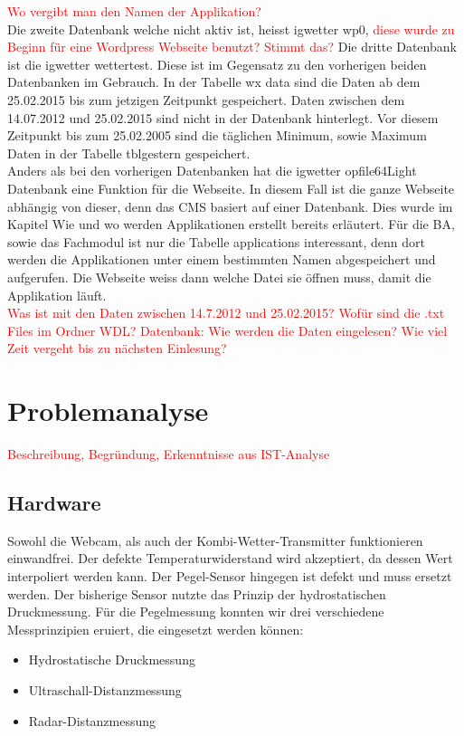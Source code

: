 \documentclass[a4paper,ngerman, 12pt]{report}
\newcommand\Diskussionspunkt[1]{\textcolor{red}{#1}}
\begin{document}
\Diskussionspunkt{Wo vergibt man den Namen der Applikation?}\\
Die zweite Datenbank welche nicht aktiv ist, heisst igwetter wp0, \Diskussionspunkt{diese wurde zu Beginn für eine Wordpress Webseite benutzt? Stimmt das?} Die dritte Datenbank ist die igwetter wettertest. Diese ist im Gegensatz zu den vorherigen beiden Datenbanken im Gebrauch. In der Tabelle wx data sind die Daten ab dem 25.02.2015 bis zum jetzigen Zeitpunkt gespeichert. Daten zwischen dem 14.07.2012 und 25.02.2015 sind nicht in der Datenbank hinterlegt. Vor diesem Zeitpunkt bis zum 25.02.2005 sind die täglichen Minimum, sowie Maximum Daten in der Tabelle tblgestern gespeichert.\\
Anders als bei den vorherigen Datenbanken hat die igwetter opfile64Light Datenbank eine Funktion für die Webseite. In diesem Fall ist die ganze Webseite abhängig von dieser, denn das CMS basiert auf einer Datenbank. Dies wurde im Kapitel Wie und wo werden Applikationen erstellt bereits erläutert. Für die BA, sowie das Fachmodul ist nur die Tabelle applications interessant, denn dort werden die Applikationen unter einem bestimmten Namen abgespeichert und aufgerufen. Die Webseite weiss dann welche Datei sie öffnen muss, damit die Applikation läuft.\\
\Diskussionspunkt{Was ist mit den Daten zwischen 14.7.2012 und 25.02.2015?}
\Diskussionspunkt{Wofür sind die .txt Files im Ordner WDL?}
\Diskussionspunkt{Datenbank: Wie werden die Daten eingelesen? Wie viel Zeit vergeht bis zu nächsten Einlesung?}
  

\section{Problemanalyse}
\Diskussionspunkt{Beschreibung, 
Begründung, 
Erkenntnisse aus IST-Analyse}

\subsection{Hardware}
Sowohl die Webcam, als auch der Kombi-Wetter-Transmitter funktionieren einwandfrei. Der defekte Temperaturwiderstand wird akzeptiert, da dessen Wert interpoliert werden kann. Der Pegel-Sensor hingegen ist defekt und muss ersetzt werden. Der bisherige Sensor nutzte das Prinzip der hydrostatischen Druckmessung. Für die Pegelmessung konnten wir drei verschiedene Messprinzipien eruiert, die eingesetzt werden können:

\begin{itemize}  
\item Hydrostatische Druckmessung
\item Ultraschall-Distanzmessung
\item Radar-Distanzmessung
\end{itemize}
\end{document}
